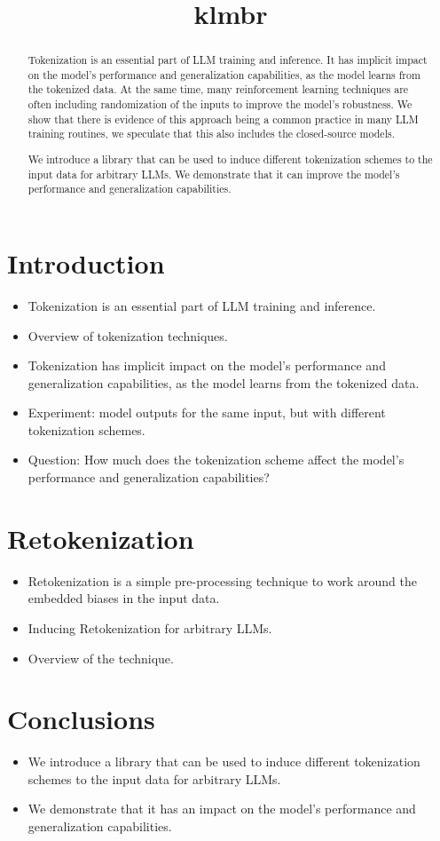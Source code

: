 \documentclass[root]{IEEEtran}
\title{klmbr}
\author{
\IEEEauthorblockN{Ivan Charapanau}
\IEEEauthorblockA{0009-0000-5894-0087 \\ Independent Researcher\\
Warsaw\\
Email: av@av.codes}
}
\begin{document}
 
\maketitle      
\begin{abstract}  
Tokenization is an essential part of LLM training and inference.
It has implicit impact on the model's performance and generalization capabilities, as the model learns from the tokenized data. 
At the same time, many reinforcement learning techniques are often including randomization of the inputs to improve the model's robustness.
We show that there is evidence of this approach being a common practice in many LLM training routines, we speculate that this also includes the closed-source models. 

We introduce a library that can be used to induce different tokenization schemes to the input data for arbitrary LLMs.
We demonstrate that it can improve the model's performance and generalization capabilities.
\end{abstract}

\section{Introduction}
\begin{itemize}
    \item Tokenization is an essential part of LLM training and inference.
    \item Overview of tokenization techniques.
    \item Tokenization has implicit impact on the model's performance and generalization capabilities, as the model learns from the tokenized data.
    \item Experiment: model outputs for the same input, but with different tokenization schemes.
    \item Question: How much does the tokenization scheme affect the model's performance and generalization capabilities?
\end{itemize}

\section{Retokenization}
\begin{itemize}
    \item Retokenization is a simple pre-processing technique to work around the embedded biases in the input data.
    \item Inducing Retokenization for arbitrary LLMs.
    \item Overview of the technique.
\end{itemize}

\section{Conclusions}

\begin{itemize}
    \item We introduce a library that can be used to induce different tokenization schemes to the input data for arbitrary LLMs.
    \item We demonstrate that it has an impact on the model's performance and generalization capabilities.
\end{itemize}
\end{document}
